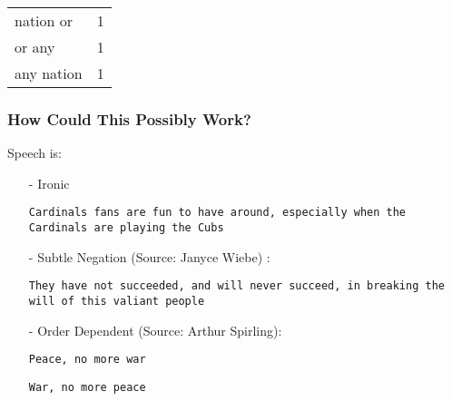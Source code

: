 \documentclass{beamer}
\numberwithin{equation}{section}
\begin{document}
\begin{frame}
{\begin{tabular}{ll}
nation or & 1  \\
or any & 1   \\
any nation & 1
\end{tabular}}


\pause \pause \pause


\end{frame}




\begin{frame}
\frametitle{How Could This Possibly Work?}


Speech is:
\begin{itemize}
\item[-] Ironic
\item[] {\tt Cardinals fans are fun to have around, especially when the Cardinals are playing the Cubs }
\item[-] Subtle Negation (Source: Janyce Wiebe) :
\item[] {\tt They have not succeeded, and will never succeed, in breaking the will of this valiant people}
\item[-] Order Dependent (Source: Arthur Spirling):
\item[]{\tt Peace, no more war}
\item[]{\tt War, no more peace}
\end{itemize}


\end{frame}
\end{document}
